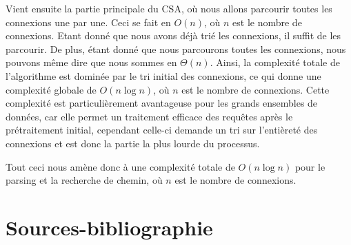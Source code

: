 \documentclass[12pt]{article}
\begin{document}
Vient ensuite la partie principale du CSA, où nous allons parcourir toutes les connexions une par une.
Ceci se fait en $O(n)$, où $n$ est le nombre de connexions. Etant donné que nous avons déjà trié les connexions, il suffit de les parcourir. 
De plus, étant donné que nous parcourons toutes les connexions, nous pouvons même dire que nous sommes en $\Theta(n)$.
Ainsi, la complexité totale de l'algorithme est dominée par le tri initial des connexions, ce qui donne une complexité globale de $O(n \log n)$, où $n$ 
est le nombre de connexions. Cette complexité est particulièrement avantageuse pour les grands ensembles de données, car elle permet un traitement efficace 
des requêtes après le prétraitement initial, cependant celle-ci demande un tri sur l'entièreté des connexions et est donc la partie la plus lourde du processus.

Tout ceci nous amène donc à une complexité totale de $O(n \log n)$ pour le parsing et la recherche de chemin, où $n$ est le nombre de connexions.

\section{Sources-bibliographie}
\cite{dibbelt2017connection} 
\cite{butts2020raptor}
\cite{epfl2024cs108}
\cite{transnetlabCSA}
\cite{gtfsReference}
\cite{futura2009distance}
\cite{geeko2018distance}
\cite{geeksforgeeks_haversine}
\cite{wikipedia_geohash}
\cite{mattaparthi2024ballkd}
\cite{fieldsend_onlineballtree}

\printbibliography
\end{document}
